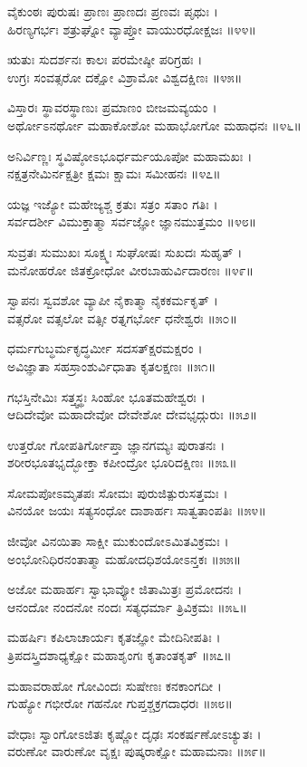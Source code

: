 ವೈಕುಂಠಃ ಪುರುಷಃ ಪ್ರಾಣಃ ಪ್ರಾಣದಃ ಪ್ರಣವಃ ಪೃಥುಃ ।\\
ಹಿರಣ್ಯಗರ್ಭಃ ಶತ್ರುಘ್ನೋ ವ್ಯಾಪ್ತೋ ವಾಯುರಧೋಕ್ಷಜಃ ॥೪೪॥

ಋತುಃ ಸುದರ್ಶನಃ ಕಾಲಃ ಪರಮೇಷ್ಠೀ ಪರಿಗ್ರಹಃ ।\\
ಉಗ್ರಃ ಸಂವತ್ಸರೋ ದಕ್ಷೋ ವಿಶ್ರಾಮೋ ವಿಶ್ವದಕ್ಷಿಣಃ ॥೪೫॥

ವಿಸ್ತಾರಃ ಸ್ಥಾವರಸ್ಥಾಣುಃ ಪ್ರಮಾಣಂ ಬೀಜಮವ್ಯಯಂ ।\\
ಅರ್ಥೋಽನರ್ಥೋ ಮಹಾಕೋಶೋ ಮಹಾಭೋಗೋ ಮಹಾಧನಃ ॥೪೬॥

ಅನಿರ್ವಿಣ್ಣಃ ಸ್ಥವಿಷ್ಠೋಽಭೂರ್ಧರ್ಮಯೂಪೋ ಮಹಾಮಖಃ ।\\
ನಕ್ಷತ್ರನೇಮಿರ್ನಕ್ಷತ್ರೀ ಕ್ಷಮಃ ಕ್ಷಾಮಃ ಸಮೀಹನಃ ॥೪೭॥

ಯಜ್ಞ ಇಜ್ಯೋ ಮಹೇಜ್ಯಶ್ಚ ಕ್ರತುಃ ಸತ್ರಂ ಸತಾಂ ಗತಿಃ ।\\
ಸರ್ವದರ್ಶೀ ವಿಮುಕ್ತಾತ್ಮಾ ಸರ್ವಜ್ಞೋ ಜ್ಞಾನಮುತ್ತಮಂ ॥೪೮॥

ಸುವ್ರತಃ ಸುಮುಖಃ ಸೂಕ್ಷ್ಮಃ ಸುಘೋಷಃ ಸುಖದಃ ಸುಹೃತ್ ।\\
ಮನೋಹರೋ ಜಿತಕ್ರೋಧೋ ವೀರಬಾಹುರ್ವಿದಾರಣಃ ॥೪೯॥

ಸ್ವಾಪನಃ ಸ್ವವಶೋ ವ್ಯಾಪೀ ನೈಕಾತ್ಮಾ ನೈಕಕರ್ಮಕೃತ್ ।\\
ವತ್ಸರೋ ವತ್ಸಲೋ ವತ್ಸೀ ರತ್ನಗರ್ಭೋ ಧನೇಶ್ವರಃ ॥೫೦॥

ಧರ್ಮಗುಬ್ಧರ್ಮಕೃದ್ಧರ್ಮೀ ಸದಸತ್ಕ್ಷರಮಕ್ಷರಂ ।\\
ಅವಿಜ್ಞಾತಾ ಸಹಸ್ರಾಂಶುರ್ವಿಧಾತಾ ಕೃತಲಕ್ಷಣಃ ॥೫೧॥

ಗಭಸ್ತಿನೇಮಿಃ ಸತ್ತ್ವಸ್ಥಃ ಸಿಂಹೋ ಭೂತಮಹೇಶ್ವರಃ ।\\
ಆದಿದೇವೋ ಮಹಾದೇವೋ ದೇವೇಶೋ ದೇವಭೃದ್ಗುರುಃ ॥೫೨॥

ಉತ್ತರೋ ಗೋಪತಿರ್ಗೋಪ್ತಾ ಜ್ಞಾನಗಮ್ಯಃ ಪುರಾತನಃ ।\\
ಶರೀರಭೂತಭೃದ್ಭೋಕ್ತಾ ಕಪೀಂದ್ರೋ ಭೂರಿದಕ್ಷಿಣಃ ॥೫೩॥

ಸೋಮಪೋಽಮೃತಪಃ ಸೋಮಃ ಪುರುಜಿತ್ಪುರುಸತ್ತಮಃ ।\\
ವಿನಯೋ ಜಯಃ ಸತ್ಯಸಂಧೋ ದಾಶಾರ್ಹಃ ಸಾತ್ವತಾಂಪತಿಃ ॥೫೪॥

ಜೀವೋ ವಿನಯಿತಾ ಸಾಕ್ಷೀ ಮುಕುಂದೋಽಮಿತವಿಕ್ರಮಃ ।\\
ಅಂಭೋನಿಧಿರನಂತಾತ್ಮಾ ಮಹೋದಧಿಶಯೋಽನ್ತಕಃ ॥೫೫॥

ಅಜೋ ಮಹಾರ್ಹಃ ಸ್ವಾಭಾವ್ಯೋ ಜಿತಾಮಿತ್ರಃ ಪ್ರಮೋದನಃ ।\\
ಆನಂದೋ ನಂದನೋ ನಂದಃ ಸತ್ಯಧರ್ಮಾ ತ್ರಿವಿಕ್ರಮಃ ॥೫೬॥

ಮಹರ್ಷಿಃ ಕಪಿಲಾಚಾರ್ಯಃ ಕೃತಜ್ಞೋ ಮೇದಿನೀಪತಿಃ ।\\
ತ್ರಿಪದಸ್ತ್ರಿದಶಾಧ್ಯಕ್ಷೋ ಮಹಾಶೃಂಗಃ ಕೃತಾಂತಕೃತ್ ॥೫೭॥

ಮಹಾವರಾಹೋ ಗೋವಿಂದಃ ಸುಷೇಣಃ ಕನಕಾಂಗದೀ ।\\
ಗುಹ್ಯೋ ಗಭೀರೋ ಗಹನೋ ಗುಪ್ತಶ್ಚಕ್ರಗದಾಧರಃ ॥೫೮॥

ವೇಧಾಃ ಸ್ವಾಂಗೋಽಜಿತಃ ಕೃಷ್ಣೋ ದೃಢಃ ಸಂಕರ್ಷಣೋಽಚ್ಯುತಃ ।\\
ವರುಣೋ ವಾರುಣೋ ವೃಕ್ಷಃ ಪುಷ್ಕರಾಕ್ಷೋ ಮಹಾಮನಾಃ ॥೫೯॥

